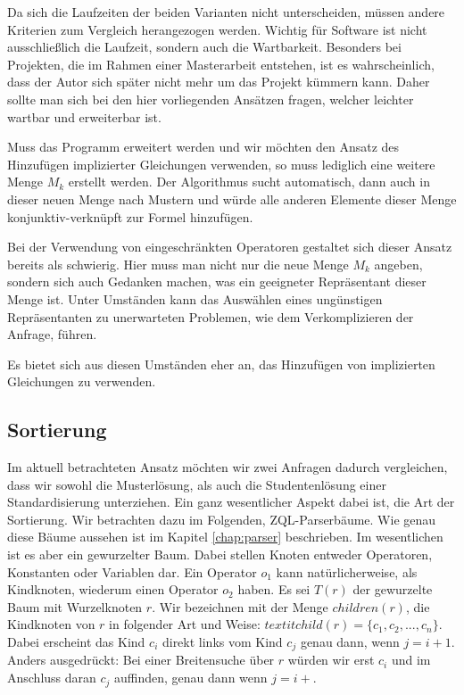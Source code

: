 Da sich die Laufzeiten der beiden Varianten nicht unterscheiden, müssen andere Kriterien zum Vergleich herangezogen werden. Wichtig für Software ist nicht ausschließlich die Laufzeit, sondern auch die Wartbarkeit. Besonders bei Projekten, die im Rahmen einer Masterarbeit entstehen, ist es wahrscheinlich, dass der Autor sich später nicht mehr um das Projekt kümmern kann. Daher sollte man sich bei den hier vorliegenden Ansätzen fragen, welcher leichter wartbar und erweiterbar ist.

Muss das Programm erweitert werden und wir möchten den Ansatz des Hinzufügen implizierter Gleichungen verwenden, so muss lediglich eine weitere Menge $M_k$ erstellt werden. Der Algorithmus sucht automatisch, dann auch in dieser neuen Menge nach Mustern und würde alle anderen Elemente dieser Menge konjunktiv-verknüpft zur Formel hinzufügen. 

Bei der Verwendung von eingeschränkten Operatoren gestaltet sich dieser Ansatz bereits als schwierig. Hier muss man nicht nur die neue Menge $M_k$ angeben, sondern sich auch Gedanken machen, was ein geeigneter Repräsentant dieser Menge ist. Unter Umständen kann das Auswählen eines ungünstigen Repräsentanten zu unerwarteten Problemen, wie dem Verkomplizieren der Anfrage, führen.

Es bietet sich aus diesen Umständen eher an, das Hinzufügen von implizierten Gleichungen zu verwenden.

\subsection{Sortierung}

Im aktuell betrachteten Ansatz möchten wir zwei Anfragen dadurch vergleichen, dass wir sowohl die Musterlösung, als auch die Studentenlösung einer Standardisierung unterziehen. Ein ganz wesentlicher Aspekt dabei ist, die Art der Sortierung. Wir betrachten dazu im Folgenden, ZQL-Parserbäume. Wie genau diese Bäume aussehen ist im Kapitel \ref{chap:parser} beschrieben. Im wesentlichen ist es aber ein gewurzelter Baum. Dabei stellen Knoten entweder Operatoren, Konstanten oder Variablen dar. Ein Operator $o_1$ kann natürlicherweise, als Kindknoten, wiederum einen Operator $o_2$ haben. Es sei $T(r)$ der gewurzelte Baum mit Wurzelknoten $r$. Wir bezeichnen mit der Menge $\mathit{children}(r)$, die Kindknoten von $r$ in folgender Art und Weise: $textit{child}(r) = \{c_1, c_2, ..., c_n\}$. Dabei erscheint das Kind $c_i$ direkt links vom Kind $c_j$ genau dann, wenn $j = i + 1$. Anders ausgedrückt: Bei einer Breitensuche über $r$ würden wir erst $c_i$ und im Anschluss daran $c_j$ auffinden, genau dann wenn $j = i + $.

